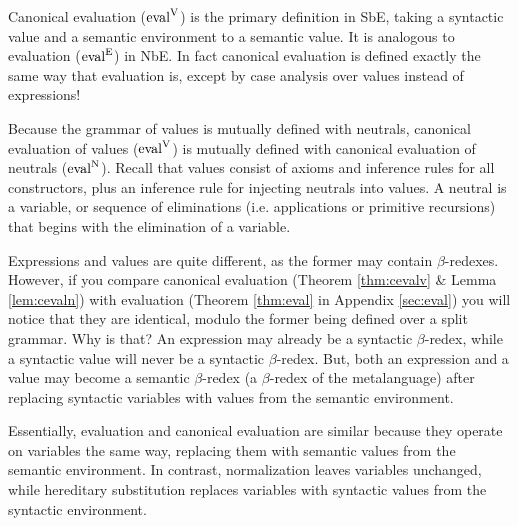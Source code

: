 \documentclass{llncs}
\newcommand{\refthm}[1]{Theorem \ref{thm:#1}}
\newcommand{\reflem}[1]{Lemma \ref{lem:#1}}
\newcommand{\refapp}[1]{Appendix \ref{sec:#1}}
\def\eval{\fun{eval}^\con{E}}
\def\cevalv{\fun{eval}^\con{V}}
\def\cevaln{\fun{eval}^\con{N}}
\newcommand{\con}[1]{\textmd{#1}}
\newcommand{\fun}[1]{\textmd{#1}}
\begin{document}
Canonical evaluation ($\cevalv$) is the primary definition in SbE, taking a
syntactic value and a semantic environment to a semantic value. It is
analogous to evaluation ($\eval$) in NbE. In fact canonical evaluation
is defined exactly the same way that evaluation is, except by case
analysis over values instead of expressions!

Because the grammar of values is mutually defined with neutrals,
canonical evaluation of values ($\cevalv$) is mutually defined with canonical
evaluation of neutrals ($\cevaln$). Recall that values consist of axioms and
inference rules for all constructors, plus an inference rule for
injecting neutrals into values. A neutral is a variable, or 
sequence of eliminations (i.e. applications or primitive recursions)
that begins with the elimination of a variable.

Expressions and values are quite different, as the former
may contain $\beta$-redexes. However, if you compare
canonical evaluation (\refthm{cevalv} \& \reflem{cevaln}) with
evaluation (\refthm{eval} in \refapp{eval}) you will notice that they are identical,
modulo the former being defined over a split grammar. Why is that?
An expression may already be a syntactic $\beta$-redex, while a
syntactic value will never be a syntactic $\beta$-redex. But, both an
expression and a value may become a semantic $\beta$-redex (a
$\beta$-redex of the metalanguage) after replacing syntactic variables
with values from the semantic environment. 

Essentially, evaluation and canonical evaluation are similar because
they operate on variables the same way, replacing them with semantic
values from the semantic environment. In contrast,
normalization leaves variables unchanged, while hereditary
substitution replaces variables with syntactic values from the
syntactic environment. 
\end{document}
